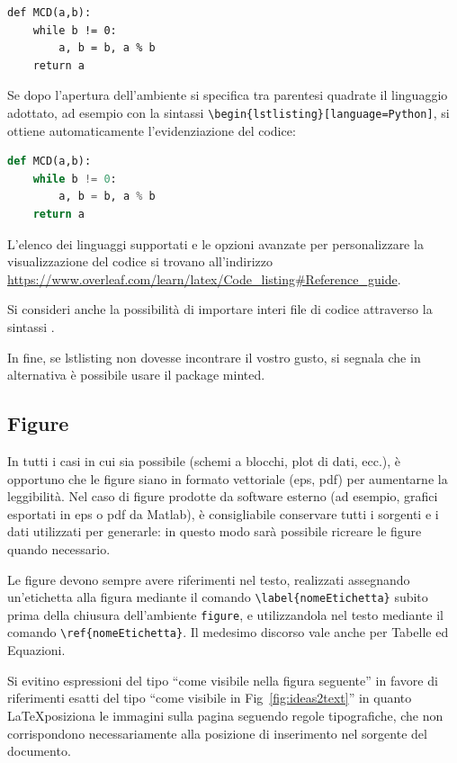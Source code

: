\documentclass[12pt]{report}
\begin{document}
    \begin{lstlisting}
def MCD(a,b):
	while b != 0:
		a, b = b, a % b
	return a
    \end{lstlisting}

    Se dopo l'apertura dell'ambiente si specifica tra parentesi quadrate il linguaggio adottato, ad esempio con la sintassi \verb|\begin{lstlisting}[language=Python]|, si ottiene automaticamente l'evidenziazione del codice:

    \begin{lstlisting}[language=Python]
def MCD(a,b):
	while b != 0:
		a, b = b, a % b
	return a
    \end{lstlisting}

    L'elenco dei linguaggi supportati e le opzioni avanzate per personalizzare la visualizzazione del codice si trovano all'indirizzo \url{https://www.overleaf.com/learn/latex/Code_listing#Reference_guide}.

    Si consideri anche la possibilità di importare interi file di codice attraverso la sintassi \verb||.

    In fine, se lstlisting non dovesse incontrare il vostro gusto, si segnala che in alternativa è possibile usare il package minted.

    \subsection{Figure}

    In tutti i casi in cui sia possibile (schemi a blocchi, plot di dati, ecc.), \`e opportuno che le figure siano in formato vettoriale (eps, pdf) per aumentarne la leggibilit\`a.
    Nel caso di figure prodotte da software esterno (ad esempio, grafici esportati in eps o pdf da Matlab), \`e consigliabile conservare tutti i sorgenti e i dati utilizzati per generarle: in questo modo sarà possibile ricreare le figure quando necessario.

    Le figure devono sempre avere riferimenti nel testo, realizzati assegnando un'etichetta alla figura mediante il comando \verb|\label{nomeEtichetta}| subito prima della chiusura dell'ambiente \verb|figure|, e utilizzandola nel testo mediante il comando \verb|\ref{nomeEtichetta}|. Il medesimo discorso vale anche per Tabelle ed Equazioni.

    Si evitino espressioni del tipo ``come visibile nella figura seguente'' in favore di riferimenti esatti del tipo ``come visibile in Fig~\ref{fig:ideas2text}'' in quanto \LaTeX posiziona le immagini sulla pagina seguendo regole tipografiche, che non corrispondono necessariamente alla posizione di inserimento nel sorgente del documento.
\end{document}
